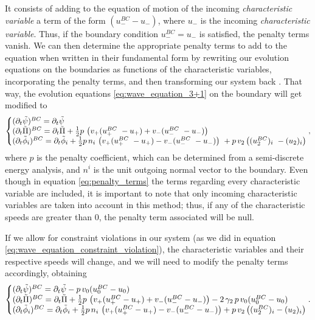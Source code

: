 It consists of adding to the equation of motion of the incoming \textit{characteristic variable} a term of the form $(u_-^{BC}  - u_-)$, where $u_-$ is the incoming \textit{characteristic variable}. Thus, if the boundary condition $u_-^{BC} = u_-$ is satisfied, the penalty terms vanish. We can then determine the appropriate penalty terms to add to the equation when written in their fundamental form by rewriting our evolution equations on the boundaries as functions of the characteristic variables, incorporating the penalty terms, and then transforming our system back \cite{Pseudospectral_method_for_gravitational_wave_collapse,Spectral_methods_for_the_wave_equation_in_second-order_form}. That way, the evolution equations \eqref{eq:wave_equation_3+1} on the boundary will get modified to
%
\begin{align}
    \left\{\begin{array}{@{}l@{}} 
        (\partial_t\tilde{\psi})^{BC} = \partial_t\tilde{\psi} \\
        (\partial_t\tilde{\Pi})^{BC} = \partial_t\tilde{\Pi} + \frac{1}{2} p \, \left( v_+(u_+^{BC}  - u_+) + v_- (u_-^{BC}  - u_-) \right) \\
        (\partial_t\tilde{\phi}_i)^{BC} = \partial_t\tilde{\phi}_i + \frac{1}{2} p \, n_i \, \left( v_+(u_+^{BC}  - u_+) - v_- (u_-^{BC}  - u_-) \right)  + p \, v_2 \left((u_2^{BC})_i  - (u_2)_i \right) \\
    \end{array}\right. ,
    \label{eq:penalty_terms}
\end{align}
%
where $p$ is the penalty coefficient, which can be determined from a semi-discrete energy analysis, and $n^i$ is the unit outgoing normal vector to the boundary. Even though in equation \eqref{eq:penalty_terms} the terms regarding every characteristic variable are included, it is important to note that only incoming characteristic variables are taken into account in this method; thus, if any of the characteristic speeds are greater than $0$, the penalty term associated will be null. 

If we allow for constraint violations in our system (as we did in equation \eqref{eq:wave_equation_constraint_violation}), the characteristic variables and their respective speeds will change, and we will need to modify the penalty terms accordingly, obtaining
%
\begin{align}
    \left\{\begin{array}{@{}l@{}} 
        (\partial_t\tilde{\psi})^{BC} = \partial_t\tilde{\psi} - p \, v_0 (u_0^{BC}  - u_0)\\
        (\partial_t\tilde{\Pi})^{BC} = \partial_t\tilde{\Pi} + \frac{1}{2} p \, \left( v_+(u_+^{BC}  - u_+) + v_- (u_-^{BC}  - u_-) \right) - 2 \, \gamma_2 \, p \, v_0 (u_0^{BC}  - u_0)\\
        (\partial_t\tilde{\phi}_i)^{BC} = \partial_t\tilde{\phi}_i + \frac{1}{2} p \, n_i \, \left( v_+(u_+^{BC}  - u_+) - v_- (u_-^{BC}  - u_-) \right)  + p \, v_2 \left((u_2^{BC})_i  - (u_2)_i \right) \\
    \end{array}\right. .
\end{align}

